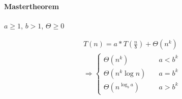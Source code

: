\documentclass[uniLeipzig]{merkzettel}
\begin{document}
\begin{mzImportant}
  \paragraph{Mastertheorem} $a \geq 1$, $b > 1$, $\Theta \geq 0$

  \begin{gather*}
    T(n) = a * T( \frac{n}{b} ) + \Theta (n^k) \\
    \Rightarrow \begin{cases}
      \Theta ( n^k ) \quad          & a < b^k \\
      \Theta ( n^k \log n ) \quad   & a = b^k \\
      \Theta ( n^{\log_b a} ) \quad & a > b^k
    \end{cases}
  \end{gather*}
\end{mzImportant}
\end{document}
